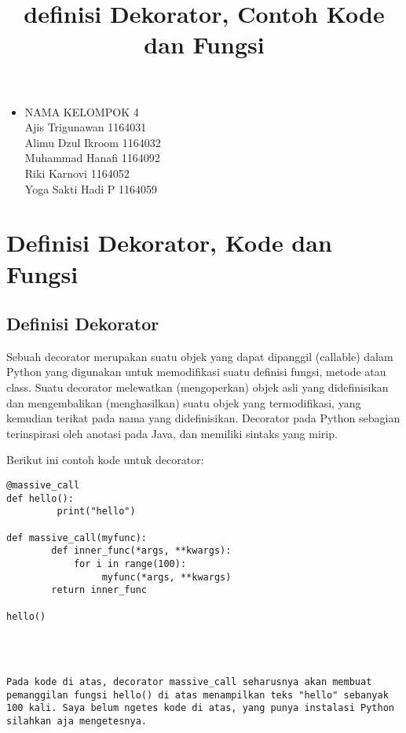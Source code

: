 \documentclass[12pt,a4paper]{article}
\begin{document}
\title{definisi Dekorator, Contoh Kode dan Fungsi}

\maketitle



\begin{itemize}



\item

NAMA KELOMPOK 4\\

Ajis Trigunawan			1164031\\

Alimu Dzul Ikroom		1164032\\

Muhammad Hanafi			1164092\\

Riki Karnovi			1164052\\

Yoga Sakti Hadi P		1164059\\



\end{itemize}



\section{Definisi Dekorator, Kode dan Fungsi}



\subsection{Definisi Dekorator}

Sebuah decorator merupakan suatu objek yang dapat dipanggil (callable) dalam Python yang digunakan untuk memodifikasi suatu definisi fungsi, metode atau class. Suatu decorator melewatkan (mengoperkan) objek asli yang didefinisikan dan mengembalikan (menghasilkan) suatu objek yang termodifikasi, yang kemudian terikat pada nama yang didefinisikan. Decorator pada Python sebagian terinspirasi oleh anotasi pada Java, dan memiliki sintaks yang mirip.
 
Berikut ini contoh kode untuk decorator:
 
 \begin{verbatim}
@massive_call
def hello():
         print("hello")
 
def massive_call(myfunc):
        def inner_func(*args, **kwargs):
            for i in range(100):
                 myfunc(*args, **kwargs)
        return inner_func
 
hello()



 
Pada kode di atas, decorator massive_call seharusnya akan membuat pemanggilan fungsi hello() di atas menampilkan teks "hello" sebanyak 100 kali. Saya belum ngetes kode di atas, yang punya instalasi Python silahkan aja mengetesnya.

\end{verbatim}
\end{document}
